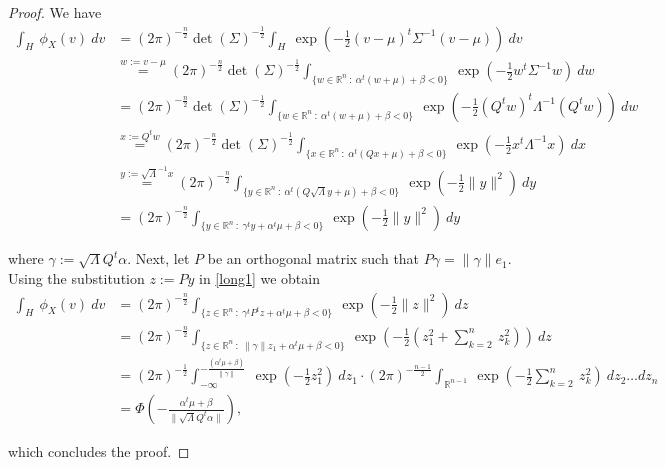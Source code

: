 \documentclass[10pt]{article}
\newcommand{\reals}{\mathbb{R}}
\begin{document}
\begin{proof}
We have 
\begin{equation}
\begin{split}
\int_H\ \phi_X(v)\ dv &= (2\pi)^{-\frac{n}{2}} \det(\Sigma)^{-\frac{1}{2}} \int_H\ \exp\left( - \frac{1}{2} (v-\mu)^t \Sigma^{-1} (v-\mu)\right)\ dv \\
&\stackrel{w := v-\mu}{=} (2\pi)^{-\frac{n}{2}} \det(\Sigma)^{-\frac{1}{2}} \int_{\{w\in\reals^n\ :\ \alpha^t(w + \mu) + \beta < 0\}}\ \exp\left( - \frac{1}{2} w^t \Sigma^{-1}w\right)\ dw\\
&= (2\pi)^{-\frac{n}{2}} \det(\Sigma)^{-\frac{1}{2}} \int_{\{w\in\reals^n\ :\ \alpha^t(w + \mu) + \beta < 0\}}\ \exp\left( - \frac{1}{2} (Q^tw)^t \Lambda^{-1} (Q^tw)\right)\ dw \\
&\stackrel{x := Q^tw}{=} (2\pi)^{-\frac{n}{2}} \det(\Sigma)^{-\frac{1}{2}} \int_{\{x\in\reals^n\ :\ \alpha^t(Qx + \mu) + \beta < 0\}}\ \exp\left( - \frac{1}{2} x^t \Lambda^{-1} x\right)\ dx \\
&\stackrel{y := \sqrt{\Lambda}^{-1}x}{=} (2\pi)^{-\frac{n}{2}} \int_{\{y\in\reals^n\ :\ \alpha^t(Q\sqrt{\Lambda}y + \mu) + \beta < 0\}}\ \exp\left( - \frac{1}{2} \|y\|^2\right)\ dy \\
&= (2\pi)^{-\frac{n}{2}} \int_{\{y\in\reals^n\ :\ \gamma^t y + \alpha^t\mu + \beta < 0\}}\ \exp\left( - \frac{1}{2} \|y\|^2\right)\ dy
\end{split}
\label{long1}
\end{equation}

\noindent
where $\gamma := \sqrt{\Lambda} Q^t\alpha$. Next, let $P$ be an orthogonal matrix such that $P\gamma = \|\gamma\| e_1.$ Using the substitution $z := Py$ in \eqref{long1} we obtain
\begin{equation*}
\begin{split}
\int_H\ \phi_X(v)\ dv &= (2\pi)^{-\frac{n}{2}} \int_{\{z\in\reals^n\ :\ \gamma^t P^t z + \alpha^t\mu + \beta < 0\}}\ \exp\left( - \frac{1}{2} \|z\|^2\right)\ dz\\
&= (2\pi)^{-\frac{n}{2}} \int_{\{z\in\reals^n\ :\ \|\gamma\| z_1 + \alpha^t\mu + \beta < 0\}}\ \exp\left( - \frac{1}{2} \left(z_1^2 + \sum_{k=2}^n\ z_k^2\right)\right)\ dz\\
&= (2\pi)^{-\frac{1}{2}} \int_{-\infty}^{-\frac{(\alpha^t\mu + \beta)}{\|\gamma\|}}\ \exp\left(-\frac{1}{2}z_1^2\right)\ dz_1 \cdot (2\pi)^{-\frac{n-1}{2}} \int_{\reals^{n-1}}\ \exp\left(-\frac{1}{2}\sum_{k=2}^n\ z_k^2\right)\ dz_2\ldots dz_n\\
&= \Phi\left(-\frac{\alpha^t\mu + \beta}{\|\sqrt{\Lambda}Q^t\alpha\|}\right),
\end{split}
\end{equation*}

\noindent
which concludes the proof.
\end{proof}
\end{document}

